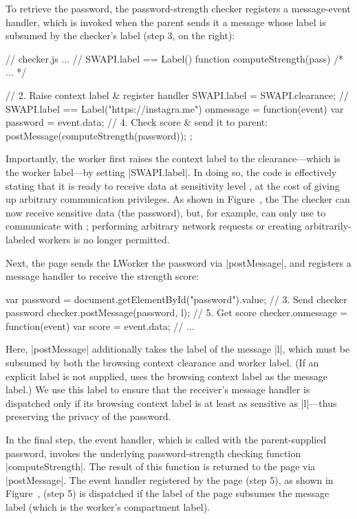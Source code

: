 To retrieve the password, the password-strength checker registers a
message-event handler, which is invoked when the parent sends it a
message whose label is subsumed by the checker's label (step 3, on the
right):
\begin{jscode}
// checker.js ...
// SWAPI.label == Label()
function computeStrength(pass) { /* ... */ }

// 2. Raise context label & register handler
SWAPI.label = SWAPI.clearance;
// SWAPI.label == Label("https://instagra.me")
onmessage = function(event) {
  var password = event.data;
  // 4. Check score & send it to parent:
  postMessage(computeStrength(password));
};
\end{jscode}
%
Importantly, the worker first raises the context label to the
clearance---which is the worker label---by setting \js|SWAPI.label|.
%
In doing so, the code is effectively stating that it is ready to
receive data at sensitivity level , at the cost of
giving up arbitrary communication privileges.
%
\iffigures
\ifcompletefigures
As shown in Figure~, the 
\else
The
\fi
\fi
checker can now receive
sensitive data (the password), but, for example, can only use \xhr{} to
communicate with ;
%
performing arbitrary network requests or creating arbitrarily-labeled
workers is no longer permitted.

Next, the page sends the LWorker the
password via \js|postMessage|, and registers a message handler to
receive the strength score:
\begin{jscode}
var password = 
 document.getElementById("password").value;
// 3. Send checker password 
checker.postMessage(password, l);
// 5. Get score
checker.onmessage = function(event) {
  var score = event.data; 
  // ...
}
\end{jscode}
Here, \js|postMessage| additionally takes the label of the message
\js|l|, which must be subsumed by both the browsing context clearance
and worker label.
%
(If an explicit label is not supplied, \sys{} uses the browsing
context label as the message label.)
%
We use this label to ensure that the receiver's message handler is
dispatched only if its browsing context label is at least as sensitive
as \js|l|---thus preserving the privacy of the password.

In the final step, the event handler, which is called with the
parent-supplied password, invokes the underlying password-strength
checking function \js|computeStrength|.
%
The result of this function is returned to the page via
\js|postMessage|.
%
The event handler registered by the page 
\iffigures
\ifcompletefigures
(step 5), as shown in Figure~, 
\else
(step 5)
\fi
\fi
is dispatched if the label of
the page subsumes the message label (which is the worker's compartment
label).

